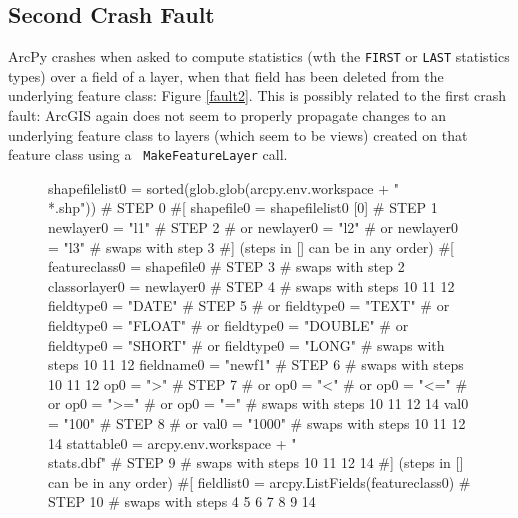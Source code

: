 \subsection{Second Crash Fault}

ArcPy crashes when asked to compute statistics (wth the {\tt FIRST} or
{\tt LAST} statistics types) over a field of a layer, when that field
has been deleted from the underlying feature class:  Figure
\ref{fault2}.  This is possibly related to the first crash fault:
ArcGIS again does not seem to properly propagate changes to an underlying
feature class to layers (which seem to be views) created on that feature class using a {\tt
  MakeFeatureLayer} call.

\begin{figure}
{\scriptsize 
\begin{code}
shapefilelist0 = sorted(glob.glob(arcpy.env.workspace + "\\*.shp"))                   \# STEP 0
\#[
shapefile0 = shapefilelist0 [0]                                                      \# STEP 1
newlayer0 = "l1"                                                                     \# STEP 2
\#  or newlayer0 = "l2" 
\#  or newlayer0 = "l3" 
\#  swaps with step 3
\#] (steps in [] can be in any order)
\#[
featureclass0 = shapefile0                                                           \# STEP 3
\#  swaps with step 2
classorlayer0 = newlayer0                                                            \# STEP 4
\#  swaps with steps 10 11 12
fieldtype0 = "DATE"                                                                  \# STEP 5
\#  or fieldtype0 = "TEXT" 
\#  or fieldtype0 = "FLOAT" 
\#  or fieldtype0 = "DOUBLE" 
\#  or fieldtype0 = "SHORT" 
\#  or fieldtype0 = "LONG" 
\#  swaps with steps 10 11 12
fieldname0 = "newf1"                                                                 \# STEP 6
\#  swaps with steps 10 11 12
op0 = ">"                                                                            \# STEP 7
\#  or op0 = "<" 
\#  or op0 = "<=" 
\#  or op0 = ">=" 
\#  or op0 = "=" 
\#  swaps with steps 10 11 12 14
val0 = "100"                                                                         \# STEP 8
\#  or val0 = "1000" 
\#  swaps with steps 10 11 12 14
stattable0 = arcpy.env.workspace + "\\stats.dbf"                                      \# STEP 9
\#  swaps with steps 10 11 12 14
\#] (steps in [] can be in any order)
\#[
fieldlist0 = arcpy.ListFields(featureclass0)                                         \# STEP 10
\#  swaps with steps 4 5 6 7 8 9 14

\end{code}}
\end{figure}
